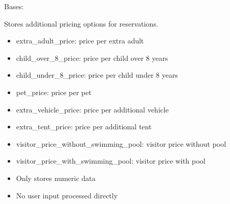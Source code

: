 \documentclass[letterpaper,10pt,english]{sphinxmanual}
\begin{document}
\begin{fulllineitems}
\label{\detokenize{index:bookings.models.SupplementPrice}}
\pysigstartsignatures
\pysiglinewithargsret
{}
{\sphinxparamcomma {}}
{}
\pysigstopsignatures
\sphinxAtStartPar
Bases: 

\sphinxAtStartPar
Stores additional pricing options for reservations.
\begin{description}
\begin{itemize}
\item {} 
\sphinxAtStartPar
extra\_adult\_price: price per extra adult

\item {} 
\sphinxAtStartPar
child\_over\_8\_price: price per child over 8 years

\item {} 
\sphinxAtStartPar
child\_under\_8\_price: price per child under 8 years

\item {} 
\sphinxAtStartPar
pet\_price: price per pet

\item {} 
\sphinxAtStartPar
extra\_vehicle\_price: price per additional vehicle

\item {} 
\sphinxAtStartPar
extra\_tent\_price: price per additional tent

\item {} 
\sphinxAtStartPar
visitor\_price\_without\_swimming\_pool: visitor price without pool

\item {} 
\sphinxAtStartPar
visitor\_price\_with\_swimming\_pool: visitor price with pool

\end{itemize}

\begin{itemize}
\item {} 
\sphinxAtStartPar
Only stores numeric data

\item {} 
\sphinxAtStartPar
No user input processed directly

\end{itemize}


\end{description}
\end{fulllineitems}
\end{document}
